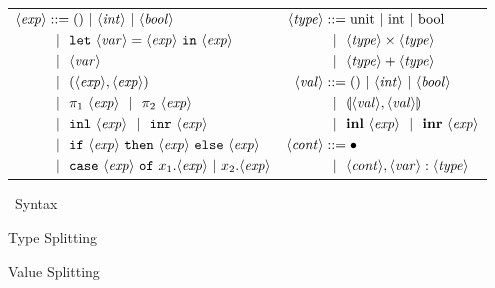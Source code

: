 \documentclass{article}
\begin{document}
\begin{figure}
\caption{\coremono~Syntax}
\label{fig:baseSyntax}
\centering
\begin{tabular}{ll} 
$\begin{aligned}
\expr &::= ()~|~\inte~|~\bool \\
&\gbar \letin{\var}{\expr}{\expr} \\
&\gbar \var \\
&\gbar (\expr, \expr) \\
&\gbar \pi_1~\expr \gbar \pi_2~\expr \\
&\gbar \inl~\expr \gbar \inr~\expr \\
&\gbar \ifthen {\expr}{\expr}{\expr}  \\
&\gbar \caseof {\expr}{x_1.\expr}{x_2.\expr} 
\end{aligned} $
& 
$\begin{aligned}
\type &::=  \rmunit~|~\text{int}~|~\text{bool} \\
&\gbar \type \times \type  \\
&\gbar \type + \type 
\\
\val &::= ()~|~\inte~|~\bool \\
&\gbar \valprod {\val} {\val}  \\
&\gbar \valinl~\expr \gbar \valinr~\expr
\\
\context &::= \emptyC \\
&\gbar \context, \var : \type
\end{aligned} $
\end{tabular}
\end{figure}


\begin{figure*}
\caption{Type Splitting}
\label{fig:typeSplit}
\end{figure*}

\begin{figure*}
\caption{Value Splitting}
\label{fig:valSplit}
\end{figure*}
\end{document}
